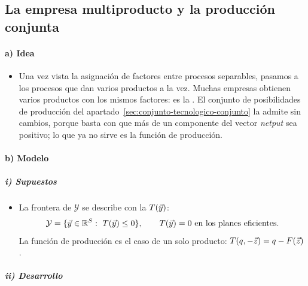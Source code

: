 \documentclass[11pt]{article}
\begin{document}
\subsection{La empresa multiproducto y la producción conjunta}\label{sec:empresa-multiproducto-produccion}

\paragraph{a) Idea}

\begin{itemize}
\item Una vez vista la asignación de factores entre procesos separables, pasamos a los procesos que dan varios productos a la vez. Muchas empresas obtienen varios productos con los mismos factores: es la . El conjunto de posibilidades de producción del apartado~\ref{sec:conjunto-tecnologico-conjunto} la admite sin cambios, porque basta con que más de un componente del vector \emph{netput} sea positivo; lo que ya no sirve es la función de producción.
\end{itemize}

\paragraph{b) Modelo}

\subparagraph{i) Supuestos}

\begin{itemize}
\item La frontera de $\mathcal{Y}$ se describe con la  $T(\vec{y})$\nocite{MasColellWhinstonGreen1995}:
  \begin{equation}
  \mathcal{Y}=\{\vect{y}\in\mathbb{R}^S:\ T(\vect{y})\leq 0\},\qquad T(\vect{y})=0\ \text{en los planes eficientes}. \label{eq:transformacion}
  \end{equation}
  La función de producción es el caso de un solo producto: $T(q,-\vec{z})=q-F(\vec{z})$.
\end{itemize}

\subparagraph{ii) Desarrollo}
\end{document}

